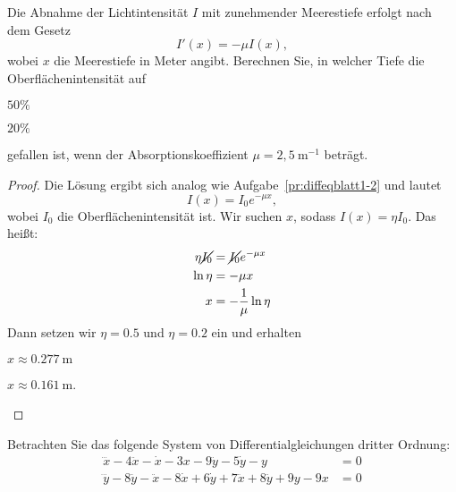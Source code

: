 \begin{Problem}
	Die Abnahme der Lichtintensität $I$ mit zunehmender Meerestiefe erfolgt nach dem Gesetz
	\[
	I'(x)=-\mu I(x)
	,\]
	wobei $x$ die Meerestiefe in Meter angibt. Berechnen Sie, in welcher Tiefe die Oberflächenintensität auf
	\begin{parts}
	\item $50\%$ 
	\item $20\%$
	\end{parts}
	gefallen ist, wenn der Absorptionskoeffizient $\mu=2,5~\text{m}^{-1}$ beträgt.
\end{Problem}
\begin{proof}
	Die Lösung ergibt sich analog wie Aufgabe~\ref{pr:diffeqblatt1-2} und lautet
	\[
	I(x)=I_0 e^{-\mu x}
	,\]
	wobei $I_0$ die Oberflächenintensität ist. Wir suchen $x$, sodass $I(x)=\eta I_0$. Das heißt:
	\begin{align*}
		\eta\cancel{I_0}&=\cancel{I_0}e^{-\mu x}\\
		\ln \eta &= -\mu x\\
x&=-\frac{1}{\mu}\ln \eta
	\end{align*}
	Dann setzen wir $\eta=0.5$ und $\eta=0.2$ ein und erhalten
	\begin{parts}
	\item $x\approx 0.277~\text{m}$
	\item  $x\approx 0.161~\text{m}$.\qedhere
	\end{parts}
\end{proof}
\begin{Problem}
Betrachten Sie das folgende System von Differentialgleichungen dritter Ordnung:	
\begin{align*}
	\dddot{x}-4\ddot{x}-\dot{x}-3x-9\ddot{y}-5\dot{y}-y&=0\\
	\dddot{y}-8\ddot{y}-\ddot{x}-8\dot{x}+6\dot{y}+7\ddot{x}+8\ddot{y}+9y-9x&=0
\end{align*}
\end{Problem}
